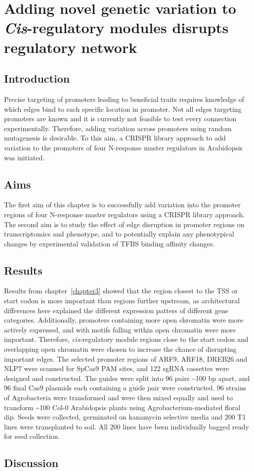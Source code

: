 \documentclass[../main.tex]{subfiles}
\begin{document}
\chapter{Adding novel genetic variation to \textit{Cis}\hyp{}regulatory modules disrupts regulatory network}\label{chapter7}
\section{Introduction}\label{chapter7:introduction}

Precise targeting of promoters leading to beneficial traits requires knowledge of which edges bind to each specific location in promoter.
Not all edges targeting promoters are known and it is currently not feasible to test every connection experimentally.
Therefore, adding variation across promoters using random mutagenesis is desirable.
To this aim, a CRISPR library approach to add variation to the promoters of four N-response master regulators in Arabidopsis was initiated.
\section{Aims}\label{chapter7:aims}
The first aim of this chapter is to successfully add variation into the promoter regions of four N\hyp{}response master regulators using a CRISPR library approach.
The second aim is to study the effect of edge disruption in promoter regions on transcriptomics and phenotype, and to potentially explain any phenotypical changes by experimental validation of TFBS binding affinity changes.

\section{Results}\label{chapter7:results}
Results from chapter~\ref{chapter3} showed that the region closest to the TSS or start codon is more important than regions further upstream, as architectural differences here explained the different expression patters of different gene categories.
Additionally, promoters containing more open chromatin were more actively expressed, and with motifs falling within open chromatin were more important.
Therefore, \textit{cis}\hyp{}regulatory module regions close to the start codon and overlapping open chromatin were chosen to increase the chance of disrupting important edges.
The selected promoter regions of ARF9, ARF18, DREB26 and NLP7 were scanned for SpCas9 PAM sites, and 122 sgRNA cassettes were designed and constructed.
The guides were split into 96 pairs \textasciitilde{}100 bp apart, and 96 final Cas9 plasmids each containing a guide pair were constructed.
96 strains of Agrobacteria were transformed and were then mixed equally and used to transform \textasciitilde{}100 Col-0 Arabidopsis plants using Agrobacterium\hyp{}mediated floral dip.
Seeds were collected, germinated on kanamycin selective media and 200 T1 lines were transplanted to soil.
All 200 lines have been individually bagged ready for seed collection.

\section{Discussion}\label{chapter7:discussion}
\end{document}
